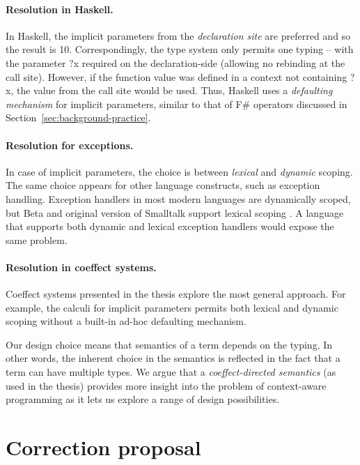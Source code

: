 \documentclass[
		twoside,openright,titlepage,numbers=noenddot,headinclude,%
                footinclude=true,cleardoublepage=empty,
                BCOR=10mm,paper=a4,fontsize=10pt, %
                ngerman,american, %
                ]{scrreprt}
\newcommand{\ident}[1]{\textnormal{\sffamily #1}}
\begin{document}
\paragraph{Resolution in Haskell.}
In Haskell, the implicit parameters from the \emph{declaration site} are preferred and so the result
is 10. Correspondingly, the type system only permits one typing -- with the parameter \ident{?x}
required on the declaration-side (allowing no rebinding at the call site). However, if the function
value was defined in a context not containing \ident{?x}, the value from the call site would be used.
Thus, Haskell uses a \emph{defaulting mechanism} for implicit parameters, similar to that of F\#
operators discussed in Section~\ref{sec:background-practice}.

\paragraph{Resolution for exceptions.}
In case of implicit parameters, the choice is between \emph{lexical} and \emph{dynamic} scoping.
The same choice appears for other language constructs, such as exception handling. Exception
handlers in most modern languages are dynamically scoped, but Beta and original version of Smalltalk
support lexical scoping \cite{app-exceptions}. A language that supports both dynamic and lexical
exception handlers would expose the same problem.

\paragraph{Resolution in coeffect systems.}
Coeffect systems presented in the thesis explore the most general approach. For example, the
calculi for implicit parameters permits both lexical and dynamic scoping without a built-in ad-hoc
defaulting mechanism.

Our design choice means that semantics of a term depends on the typing. In other words, the
inherent choice in the semantics is reflected in the fact that a term can have multiple types.
We argue that a \emph{coeffect-directed semantics} (as used in the thesis) provides more insight
into the problem of context-aware programming as it lets us explore a range of design
possibilities.

\section{Correction proposal}
\label{sec:proposal}
\vspace{-1em}
\end{document}
